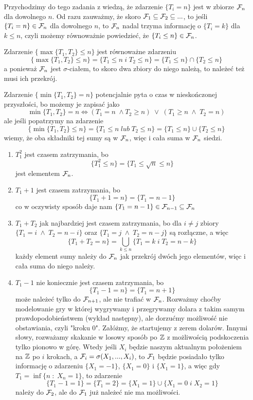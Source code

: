\begin{solution}
  Przychodzimy do tego zadania z wiedzą, że zdarzenie $\{T_i=n\}$ jest w zbiorze $\mathcal{F}_n$ dla dowolnego $n$. Od razu zauważmy, że skoro $\mathcal{F}_1\subseteq\mathcal{F}_2\subseteq...$, to jeśli $\{T_i=n\}\in\mathcal{F}_n$ dla dowolnego $n$, to $\mathcal{F}_n$ nadal trzyma informację o $\{T_i=k\}$ dla $k\leq n$, czyli możemy równoważnie powiedzieć, że $\{T_i\leq n\}\in\mathcal{F}_n$.

  Zdarzenie $\{\max\{T_1,T_2\}\leq n\}$ jest równoważne zdarzeniu 
  $$\{\max\{T_1,T_2\}\leq n\}=\{T_1\leq n\;i\;T_2\leq n\}=\{T_1\leq n\}\cap \{T_2\leq n\}$$
  a ponieważ $\mathcal{F}_n$ jest $\sigma$-ciałem, to skoro dwa zbiory do niego należą, to należeć też musi ich przekrój.

  Zdarzenie $\{\min\{T_1,T_2\}=n\}$ potencjalnie pyta o czas w nieskończonej przyszłości, bo możemy je zapisać jako
  $$\min\{T_1, T_2\}=n\iff (T_1=n\;\land T_2\geq n)\;\lor\;(T_1\geq n\;\land\; T_2=n)$$
  ale jeśli popatrzymy na zdarzenie
  $$\{\min\{T_1,T_2\}\leq n\}=\{T_1\leq n\;lub\;T_2\leq n\}=\{T_1\leq n\}\cup \{T_2\leq n\}$$
  wiemy, że oba składniki tej sumy są w $\mathcal{F}_n$, więc i cała suma w $\mathcal{F}_n$ siedzi.

  \begin{enumerate}
    \item $T_1^2$ jest czasem zatrzymania, bo
      $$\{T_1^2\leq n\}=\{T_1\leq\sqrt{n}\leq n\}$$
      jest elementem $\mathcal{F}_n$.
    \item $T_1+1$ jest czasem zatrzymania, bo
      $$\{T_1+1= n\}=\{T_1= n-1\}$$
      co w oczywisty sposób daje nam $\{T_1=n-1\}\in\mathcal{F}_{n-1}\subseteq\mathcal{F}_n$
    \item $T_1+T_2$ jak najbardziej jest czasem zatrzymania, bo dla $i\neq j$ zbiory $\{T_1=i\;\land\;T_2=n-i\}$ oraz $\{T_1=j\;\land\;T_2=n-j\}$ są rozłączne, a więc
      $$\{T_1+T_2=n\}=\bigcup_{k\leq n}\{T_1=k\;i\;T_2=n-k\}$$
      każdy element sumy należy do $\mathcal{F}_n$ jak przekrój dwóch jego elementów, więc i cała suma do niego należy.
    \item $T_1-1$ nie koniecznie jest czasem zatrzymania, bo
      $$\{T_1-1=n\}=\{T_1=n+1\}$$
      może należeć tylko do $\mathcal{F}_{n+1}$, ale nie trafiać w $\mathcal{F}_n$. Rozważmy choćby modelowanie gry w której wygrywamy i przegrywamy dolara z takim samym prawdopodobieństwem (wykład następny), ale dorzućmy możliwość nie obstawiania, czyli "kroku 0". Załóżmy, że startujemy z zerem dolarów. Innymi słowy, rozważamy skakanie w losowy sposób po $\operatorname{\mathbb{Z}}$ z możliwością podskoczenia tylko pionowo w górę. Wtedy jeśli $X_i$ będzie naszym aktualnym położeniem na $\operatorname{\mathbb{Z}}$ po $i$ krokach, a $\mathcal{F}_i=\sigma(X_1,...,X_i)$, to $\mathcal{F}_1$ będzie posiadało tylko informację o zdarzeniu $\{X_1=-1\}$, $\{X_1=0\}$ i $\{X_1=1\}$, a więc gdy $T_1=\inf\{n\;:\;X_n=1\}$, to zdarzenie
      $$\{T_1-1=1\}=\{T_1=2\}=\{X_1=1\}\cup \{X_1=0\;i\;X_2=1\}$$
      należy do $\mathcal{F}_2$, ale do $\mathcal{F}_1$ już należeć nie ma możliwości.
  \end{enumerate}
\end{solution}

